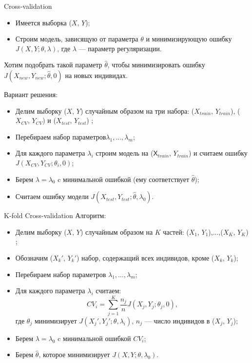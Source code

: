 \documentclass[11pt]{beamer}
\begin{document}
\begin{frame}{Cross-validation}
	\begin{itemize}
		\item Имеется выборка ($X$, $Y$);
		
		\item Строим модель, зависящую от параметра $\theta$ и минимизирующую ошибку $J(X,Y; \theta, \lambda)$, где $\lambda$ --- параметр регуляризации. 
		
	\end{itemize}
	
	\pause
	
	Хотим подобрать такой параметр $\hat \theta$, чтобы минимизировать ошибку $J({X}_{new},{Y}_{new};\hat \theta,0)$ на новых индивидах.
	
	Вариант решения:
	\begin{itemize}
		\item Делим выборку ($X$, $Y$) случайным образом на три набора: (${X}_{train}$, ${Y}_{train}$), (${X}_{CV}$, ${Y}_{CV}$) и (${X}_{test}$, ${Y}_{test}$) ; 
		
		\item Перебираем набор параметров${\lambda_1,\ldots,\lambda_m}$; 
		
		\item Для каждого параметра $\lambda_i$ строим модель на ($\mathsf{X}_{train}$, ${Y}_{train}$) и считаем ошибку $J(X_{CV},Y_{CV};\theta_{i}, 0)$; 
		
		\item Берем $\lambda=\lambda_0$ c минимальной ошибкой (ему соответствует $\hat \theta$);
		
		\item Считаем ошибку модели $J(X_{test},Y_{test};\hat \theta,\lambda_0)$.
	\end{itemize}
\end{frame}

\begin{frame}{K-fold Cross-validation}
	Алгоритм:
	\begin{itemize}
		\item Делим выборку ($X$, $Y$) случайным образом на $K$ частей: (${X}_1$, ${Y}_1$),...,(${X}_K$, ${Y}_K$)  ; 
		
		\item Обозначим (${X}_k'$, ${Y}_k'$) набор, содержащий всех индивидов, кроме (${X}_k$, ${Y}_k$);
		
		\item Перебираем набор параметров ${\lambda_1,\ldots,\lambda_m}$; 
		
		\item Для каждого параметра $\lambda_i$ считаем: 
		$$
		CV_i=\sum_{j=1}^{K}\frac{n_j}{n} J({X}_j,{Y}_j;\theta_j,0),
		$$
		где $\theta_j$ минимизирует $J({X}_j',{Y}_j';\theta,\lambda_i)$, $n_j$ --- число индивидов в (${X}_j$, ${Y}_j$);
		
		\item Берем $\lambda=\lambda_0$ c минимальной ошибкой $CV_i$;
		
		\item Берем $\hat \theta$, которое минимизирует $J(X,Y;\theta,\lambda_0)$.
		
	\end{itemize}
\end{frame}
\end{document}
